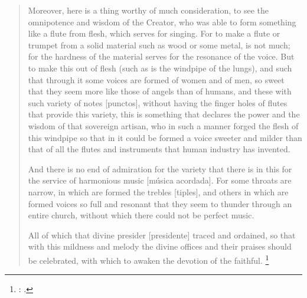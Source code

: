 \begin{quotation}
%
Moreover, here is a thing worthy of much consideration, to see the omnipotence and wisdom of the Creator, who was able to form something like a flute from flesh, which serves for singing.
For to make a flute or trumpet from a solid material such as wood or some metal, is not much; for the hardness of the material serves for the resonance of the voice.
But to  make this out of flesh (such as is the windpipe of the lungs), and such that through it some voices are formed of women and of men, so sweet that they seem more like those of angels than of humans, and these with such variety of notes [punctos], without having the finger holes of flutes that provide this variety, this is something that declares the power and the wisdom of that sovereign artisan, who in such a manner forged the flesh of this windpipe so that in it could be formed a voice sweeter and milder than that of all the flutes and instruments that human industry has invented.

And there is no end of admiration for the variety that there is in this for the service of harmonious music [música acordada]. 
For some throats are narrow, in which are formed the trebles [tiples], and others in which are formed voices so full and resonant that they seem to thunder through an entire church, without which there could not be perfect music.

All of which that divine presider [presidente] traced and ordained, so that with this mildness and melody the divine offices and their praises should be celebrated, with which to awaken the devotion of the faithful.%
	\footnote{%
	\Autocite[252]{LuisdeGranada:Simbolo}: .
	}
%
\end{quotation}

